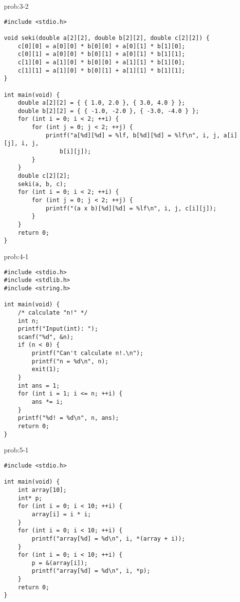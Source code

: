 \begin{renshuu-answer}{prob:3-2}
\baselineskip=12pt
\begin{verbatim}
#include <stdio.h>

void seki(double a[2][2], double b[2][2], double c[2][2]) {
    c[0][0] = a[0][0] * b[0][0] + a[0][1] * b[1][0];
    c[0][1] = a[0][0] * b[0][1] + a[0][1] * b[1][1];
    c[1][0] = a[1][0] * b[0][0] + a[1][1] * b[1][0];
    c[1][1] = a[1][0] * b[0][1] + a[1][1] * b[1][1];
}

int main(void) {
    double a[2][2] = { { 1.0, 2.0 }, { 3.0, 4.0 } };
    double b[2][2] = { { -1.0, -2.0 }, { -3.0, -4.0 } };
    for (int i = 0; i < 2; ++i) {
        for (int j = 0; j < 2; ++j) {
            printf("a[%d][%d] = %lf, b[%d][%d] = %lf\n", i, j, a[i][j], i, j,
                b[i][j]);
        }
    }
    double c[2][2];
    seki(a, b, c);
    for (int i = 0; i < 2; ++i) {
        for (int j = 0; j < 2; ++j) {
            printf("(a x b)[%d][%d] = %lf\n", i, j, c[i][j]);
        }
    }
    return 0;
}
\end{verbatim}
\end{renshuu-answer}
\begin{renshuu-answer}{prob:4-1}
\baselineskip=12pt
\begin{verbatim}
#include <stdio.h>
#include <stdlib.h>
#include <string.h>

int main(void) {
    /* calculate "n!" */
    int n;
    printf("Input(int): ");
    scanf("%d", &n);
    if (n < 0) {
        printf("Can't calculate n!.\n");
        printf("n = %d\n", n);
        exit(1);
    }
    int ans = 1;
    for (int i = 1; i <= n; ++i) {
        ans *= i;
    }
    printf("%d! = %d\n", n, ans);
    return 0;
}
\end{verbatim}
\end{renshuu-answer}
\begin{renshuu-answer}{prob:5-1}
\baselineskip=12pt
\begin{verbatim}
#include <stdio.h>

int main(void) {
    int array[10];
    int* p;
    for (int i = 0; i < 10; ++i) {
        array[i] = i * i;
    }
    for (int i = 0; i < 10; ++i) {
        printf("array[%d] = %d\n", i, *(array + i));
    }
    for (int i = 0; i < 10; ++i) {
        p = &(array[i]);
        printf("array[%d] = %d\n", i, *p);
    }
    return 0;
}
\end{verbatim}
\end{renshuu-answer}

